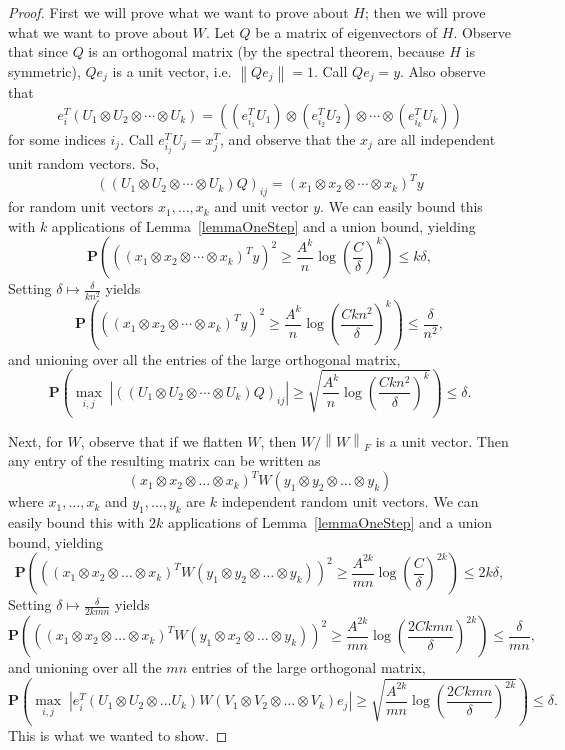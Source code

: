 \begin{proof}
    First we will prove what we want to prove about $H$; then we will prove what we want to prove about $W$. Let $Q$ be a matrix of eigenvectors of $H$. Observe that since $Q$ is an orthogonal matrix (by the spectral theorem, because $H$ is symmetric), $Q e_j$ is a unit vector, i.e. $\left\| Q e_j \right\| = 1$. Call $Q e_j = y$. Also observe that
    \[
        e_i^T (U_1 \otimes U_2 \otimes \cdots \otimes U_k) = ((e_{i_1}^T U_1) \otimes (e_{i_2}^T U_2) \otimes \cdots \otimes (e_{i_k}^T U_k))
    \]
    for some indices $i_j$. Call $e_{i_j}^T U_j = x_j^T$, and observe that the $x_j$ are all independent unit random vectors. So,
    \[
        \left( (U_1 \otimes U_2 \otimes \cdots \otimes U_k) Q \right)_{ij}
        =
        (x_1 \otimes x_2 \otimes \cdots \otimes x_k)^T y
    \]
    for random unit vectors $x_1, \ldots, x_k$ and unit vector $y$. We can easily bound this with $k$ applications of Lemma~\ref{lemmaOneStep} and a union bound, yielding
    \[
        \mathbf{P}\left( \left( (x_1 \otimes x_2 \otimes \cdots \otimes x_k)^T y \right)^2 \ge \frac{A^k}{n} \log\left( \frac{C}{\delta} \right)^k \right) \le k \delta,
    \]
    Setting $\delta \mapsto \frac{\delta}{k n^2}$ yields
    \[
        \mathbf{P}\left( \left( (x_1 \otimes x_2 \otimes \cdots \otimes x_k)^T y \right)^2 \ge \frac{A^k}{n} \log\left( \frac{C k n^2}{\delta} \right)^k \right) \le
        \frac{\delta}{n^2},
    \]
    and unioning over all the entries of the large orthogonal matrix,
    \[
        \mathbf{P}\left( \max_{i,j} \; \left| \left( (U_1 \otimes U_2 \otimes \cdots \otimes U_k) Q \right)_{ij} \right| \ge \sqrt{ \frac{A^k}{n} \log\left( \frac{C k n^2}{\delta} \right)^k } \right) \le
        \delta.
    \]

    Next, for $W$, observe that if we flatten $W$, then $W/\left\|W\right\|_F$ is a unit vector. Then any entry of the resulting matrix can be written as
    \[
        (x_1 \otimes x_2 \otimes \dots \otimes x_k)^T W (y_1 \otimes y_2 \otimes \dots \otimes y_k)
    \]
    where $x_1, \dots, x_k$ and $y_1, \dots, y_k$ are $k$ independent random unit vectors. We can easily bound this with $2k$ applications of Lemma~\ref{lemmaOneStep} and a union bound, yielding
    \[
        \mathbf{P}\left( \left( 
        (x_1 \otimes x_2 \otimes \dots \otimes x_k)^T W (y_1 \otimes y_2 \otimes \dots \otimes y_k)
        \right)^2 \ge \frac{A^{2k}}{mn} \log\left( \frac{C}{\delta} \right)^{2k} \right) \le 2 k \delta,
    \]
    Setting $\delta \mapsto \frac{\delta}{2 k m n}$ yields
    \[
        \mathbf{P}\left( \left( 
        (x_1 \otimes x_2 \otimes \dots \otimes x_k)^T W (y_1 \otimes x_2 \otimes \dots \otimes y_k)
        \right)^2 \ge \frac{A^{2k}}{mn} \log\left( \frac{2 C k mn}{\delta} \right)^{2k} \right) \le
        \frac{\delta}{m n},
    \]
    and unioning over all the $mn$ entries of the large orthogonal matrix,
    \[
        \mathbf{P}\left( \max_{i,j} \; \left| e_i^T (U_1 \otimes U_2 \otimes \dots U_k) W (V_1 \otimes V_2 \otimes \dots \otimes V_k) e_j \right|  \ge \sqrt{ \frac{A^{2k}}{mn} \log\left( \frac{2 C k mn}{\delta} \right)^{2k} } \right) \le
        \delta.
    \]
    This is what we wanted to show.

\end{proof}

